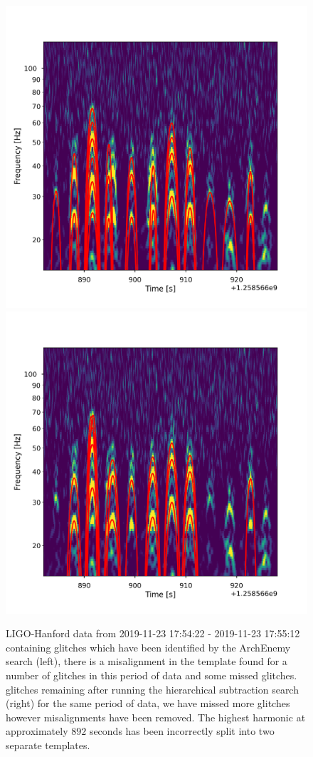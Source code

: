 \begin{figure}
     \centering
     \begin{minipage}[t]{1.0\linewidth}
        \includegraphics[width=0.49\linewidth]{images/4_archenemy/Section3/3.6/overlay_good_overlays_first.pdf}
        \hspace{0.02\linewidth}
        \includegraphics[width=0.49\linewidth]{images/4_archenemy/Section3/3.6/overlay_good_overlays_second.pdf}
     \end{minipage}
         \caption{LIGO-Hanford data from 2019-11-23 17:54:22 - 2019-11-23 17:55:12 containing \scl{} glitches which have been identified by the ArchEnemy search (left), there is a misalignment in the template found for a number of glitches in this period of data and some missed glitches. \Scl{} glitches remaining after running the hierarchical subtraction search (right) for the same period of data, we have missed more \scl{} glitches however misalignments have been removed. The highest harmonic at approximately $892$ seconds has been incorrectly split into two separate templates.}
    \label{4:fig:overlay_goods}
\end{figure}

